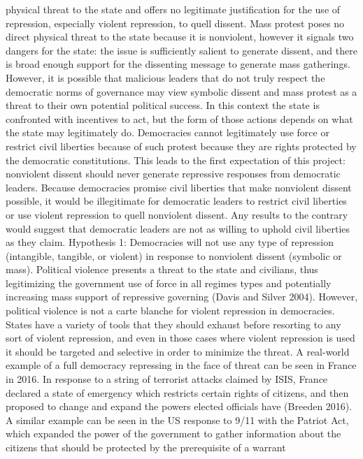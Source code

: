 \documentclass[ignorenonframetext,]{beamer}
\begin{document}
\begin{frame}[fragile]
physical threat to the state and offers no legitimate justification for
the use of repression, especially violent repression, to quell dissent.
Mass protest poses no direct physical threat to the state because it is
nonviolent, however it signals two dangers for the state: the issue is
sufficiently salient to generate dissent, and there is broad enough
support for the dissenting message to generate mass gatherings. However,
it is possible that malicious leaders that do not truly respect the
democratic norms of governance may view symbolic dissent and mass
protest as a threat to their own potential political success. In this
context the state is confronted with incentives to act, but the form of
those actions depends on what the state may legitimately do. Democracies
cannot legitimately use force or restrict civil liberties because of
such protest because they are rights protected by the democratic
constitutions. This leads to the first expectation of this project:
nonviolent dissent should never generate repressive responses from
democratic leaders. Because democracies promise civil liberties that
make nonviolent dissent possible, it would be illegitimate for
democratic leaders to restrict civil liberties or use violent repression
to quell nonviolent dissent. Any results to the contrary would suggest
that democratic leaders are not as willing to uphold civil liberties as
they claim. Hypothesis 1: Democracies will not use any type of
repression (intangible, tangible, or violent) in response to nonviolent
dissent (symbolic or mass). Political violence presents a threat to the
state and civilians, thus legitimizing the government use of force in
all regimes types and potentially increasing mass support of repressive
governing (Davis and Silver 2004). However, political violence is not a
carte blanche for violent repression in democracies. States have a
variety of tools that they should exhaust before resorting to any sort
of violent repression, and even in those cases where violent repression
is used it should be targeted and selective in order to minimize the
threat. A real-world example of a full democracy repressing in the face
of threat can be seen in France in 2016. In response to a string of
terrorist attacks claimed by ISIS, France declared a state of emergency
which restricts certain rights of citizens, and then proposed to change
and expand the powers elected officials have (Breeden 2016). A similar
example can be seen in the US response to 9/11 with the Patriot Act,
which expanded the power of the government to gather information about
the citizens that should be protected by the prerequisite of a warrant

\end{frame}
\end{document}
